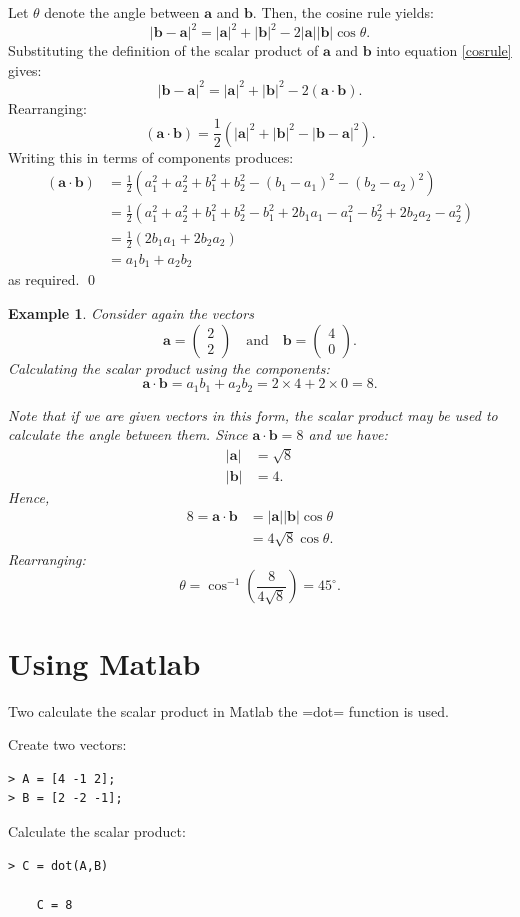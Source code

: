 \documentclass[12pt,a4paper]{article}
\theoremstyle{clearprint}
\renewenvironment{proof}[1][\proofname]
{\noindent{\bf {#1}.}\hspace*{1em}}%
{\qed\par}%
\newtheorem{example}[proposition]{Example}
\newcommand{\bvec}[1]{\mathrm{\mathbf{#1}}}
\newcommand{\cvec}[2]{\begin{pmatrix} #1 \\ #2 \end{pmatrix}}
\newcommand{\vmod}[1]{\lvert #1 \rvert}
\begin{document}
\begin{proof}
Let \(\theta\) denote the angle between \(\bvec{a}\) and \(\bvec{b}\). Then, the cosine rule yields:
\begin{equation}
\label{cosrule}
{\vmod{\bvec{b}-\bvec{a}}}^2 = {\vmod{\bvec{a}}}^2 + {\vmod{\bvec{b}}}^2 - 2\vmod{\bvec{a}}\vmod{\bvec{b}}\cos\theta. 
\end{equation} 
Substituting the definition of the scalar product of \(\bvec{a}\) and \(\bvec{b}\) into equation \ref{cosrule} gives:
\[
{\vmod{\bvec{b}-\bvec{a}}}^2 = {\vmod{\bvec{a}}}^2 + {\vmod{\bvec{b}}}^2 - 2\left(\bvec{a}\cdot \bvec{b}\right).
\] 
Rearranging:
\[
\left(\bvec{a}\cdot \bvec{b}\right) = \frac{1}{2}\left({\vmod{\bvec{a}}}^2 + {\vmod{\bvec{b}}}^2 - {\vmod{\bvec{b}-\bvec{a}}}^2\right).
\]
Writing this in terms of components produces:
\begin{align*}
\left(\bvec{a}\cdot \bvec{b}\right) &= \frac{1}{2}\left(a_1^2 + a_2^2 + b_1^2 + b_2^2 - (b_1 - a_1)^2 - (b_2 - a_2)^2\right)\\
&=\frac{1}{2}\left(a_1^2 + a_2^2 + b_1^2 + b_2^2 - b_1^2 + 2b_1a_1 - a_1^2 - b_2^2 + 2b_2a_2 - a_2^2\right)\\
&=\frac{1}{2}\left(2b_1a_1 + 2b_2a_2\right)\\
&=a_1b_1 + a_2b_2
\end{align*}
as required. 
\end{proof}

\begin{example}
Consider again the vectors
\[
\bvec{a} = \cvec{2}{2} \quad \text{and} \quad \bvec{b} = \cvec{4}{0}.
\]
Calculating the scalar product using the components:
\[
\bvec{a} \cdot \bvec{b} = a_1b_1 + a_2b_2 = 2\times 4 + 2\times 0 = 8. 
\]

Note that if we are given vectors in this form, the scalar product may be used to calculate the angle between them. Since \(\bvec{a} \cdot \bvec{b} = 8\) and we have:
\begin{align*}
\vmod{\bvec{a}} &= \sqrt{8}\\
\vmod{\bvec{b}} &= 4.
\end{align*}
Hence,
\begin{align*}
8 = \bvec{a} \cdot \bvec{b} &= \vmod{\bvec{a}}\vmod{\bvec{b}}\cos\theta\\
&= 4\sqrt{8}\cos \theta.
\end{align*}
Rearranging:
\[
\theta = \cos^{-1}\left(\frac{8}{4\sqrt{8}}\right) = {45}^{\circ}.
\]
\end{example}

\section{Using Matlab}

Two calculate the scalar product in Matlab the \spverb=dot= function is used. 

Create two vectors:
\begin{lstlisting}
> A = [4 -1 2];
> B = [2 -2 -1];
\end{lstlisting}

Calculate the scalar product:
\begin{lstlisting}
> C = dot(A,B)
    
    C = 8
\end{lstlisting}
\end{document}
